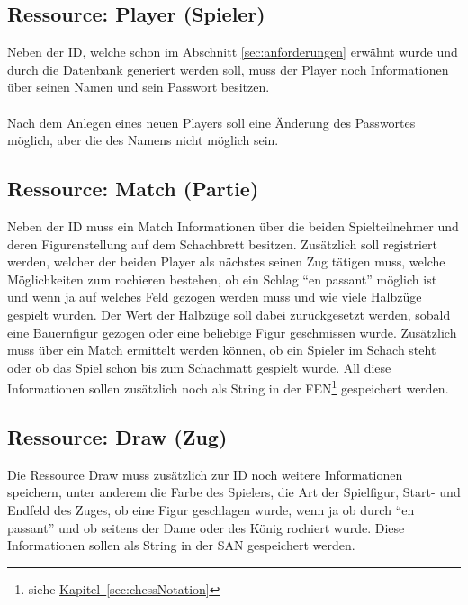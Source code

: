 \subsection{Ressource: Player (Spieler)}\label{sec:resplayer}
Neben der ID, welche schon im Abschnitt \ref{sec:anforderungen} erwähnt wurde und durch die Datenbank generiert werden soll, muss der Player noch Informationen über seinen Namen und sein Passwort besitzen.\\
\\
Nach dem Anlegen eines neuen Players soll eine Änderung des Passwortes möglich, aber die des Namens nicht möglich sein.

\subsection{Ressource: Match (Partie)}\label{sec:resmatch}
Neben der ID muss ein Match Informationen über die beiden Spielteilnehmer und deren Figurenstellung auf dem Schachbrett besitzen. Zusätzlich soll registriert werden, welcher der beiden Player als nächstes seinen Zug tätigen muss, welche Möglichkeiten zum rochieren bestehen, ob ein Schlag \enquote{en passant} möglich ist und wenn ja auf welches Feld gezogen werden muss und wie viele Halbzüge gespielt wurden. Der Wert der Halbzüge soll dabei zurückgesetzt werden, sobald eine Bauernfigur gezogen oder eine beliebige Figur geschmissen wurde. Zusätzlich muss über ein Match ermittelt werden können, ob ein Spieler im Schach steht oder ob das Spiel schon bis zum Schachmatt gespielt wurde. All diese Informationen sollen zusätzlich noch als String in der \gls{FEN}\footnote{\label{foot:chapter}siehe \hyperref[sec:chessNotation]{Kapitel~\ref{sec:chessNotation}}} gespeichert werden.

\subsection{Ressource: Draw (Zug)}\label{sec:resdraw}
Die Ressource Draw muss zusätzlich zur ID noch weitere Informationen speichern, unter anderem die Farbe des Spielers, die Art der Spielfigur, Start- und Endfeld des Zuges, ob eine Figur geschlagen wurde, wenn ja ob durch \enquote{en passant} und ob seitens der Dame oder des König rochiert wurde. Diese Informationen sollen als String in der \gls{SAN} gespeichert werden.

